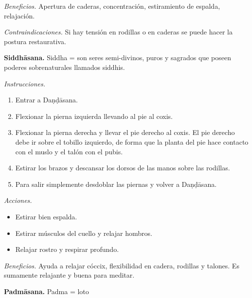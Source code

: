 \emph{Beneficios.} Apertura de caderas,
concentración, estiramiento de espalda,
relajación.

\emph{Contraindicaciones.} Si hay tensión en
rodillas o en caderas se puede hacer la
postura restaurativa.

\medskip\noindent\textbf{Siddhāsana.}
Siddha = son seres semi-divinos, puros y
sagrados que poseen poderes sobrenaturales
llamados siddhis.

\emph{Instrucciones.}
\begin{enumerate}
\item Entrar a Daṇḍāsana.
\item Flexionar la pierna izquierda llevando
al pie al coxis.
\item Flexionar la pierna derecha y llevar el
pie derecho al coxis. El pie derecho debe ir
sobre el tobillo izquierdo, de forma que la
planta del pie hace contacto con el muslo y
el talón con el pubis.
\item Estirar los brazos y descansar los
dorsos de las manos sobre las rodillas.
\item Para salir simplemente desdoblar las
piernas y volver a Daṇḍāsana.
\end{enumerate}

\emph{Acciones.}
\begin{itemize}
\item Estirar bien espalda.
\item Estirar músculos del cuello y relajar
hombros.
\item Relajar rostro y respirar profundo.
\end{itemize}

\emph{Beneficios.} Ayuda a relajar cóccix,
flexibilidad en cadera, rodillas y talones.
Es sumamente relajante y buena para meditar.

\medskip\noindent\textbf{Padmāsana.}
Padma = loto

